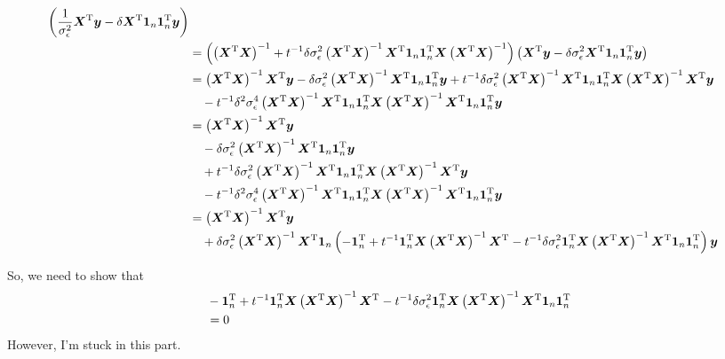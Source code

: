\documentclass[a4paper]{article}
\begin{document}
\begin{align*}
\left(\frac{1}{\sigma_{\epsilon}^{2}}\bm{X}^{\rm T}\bm{y} -\delta\bm{X}^{\rm T}\bm{1}_{n}\bm{1}_{n}^{\rm T}\bm{y}\right)\\
&= \left(\left(\bm{X}^{\rm T}\bm{X}\right)^{-1} + t^{-1}\delta\sigma_{\epsilon}^{2}\left(\bm{X}^{\rm T}\bm{X}\right)^{-1}\bm{X}^{\rm T}\bm{1}_{n}\bm{1}_{n}^{\rm T}\bm{X}\left(\bm{X}^{\rm T}\bm{X}\right)^{-1}\right)
\left(\bm{X}^{\rm T}\bm{y} -\delta\sigma_{\epsilon}^{2}\bm{X}^{\rm T}\bm{1}_{n}\bm{1}_{n}^{\rm T}\bm{y}\right)\\
&= \left(\bm{X}^{\rm T}\bm{X}\right)^{-1}\bm{X}^{\rm T}\bm{y} -\delta\sigma_{\epsilon}^{2}\left(\bm{X}^{\rm T}\bm{X}\right)^{-1}\bm{X}^{\rm T}\bm{1}_{n}\bm{1}_{n}^{\rm T}\bm{y} +  t^{-1}\delta\sigma_{\epsilon}^{2}\left(\bm{X}^{\rm T}\bm{X}\right)^{-1}\bm{X}^{\rm T}\bm{1}_{n}\bm{1}_{n}^{\rm T}\bm{X}\left(\bm{X}^{\rm T}\bm{X}\right)^{-1}\bm{X}^{\rm T}\bm{y}\\
&\quad -t^{-1}\delta^{2}\sigma_{\epsilon}^{4}\left(\bm{X}^{\rm T}\bm{X}\right)^{-1}\bm{X}^{\rm T}\bm{1}_{n}\bm{1}_{n}^{\rm T}\bm{X}\left(\bm{X}^{\rm T}\bm{X}\right)^{-1}\bm{X}^{\rm T}\bm{1}_{n}\bm{1}_{n}^{\rm T}\bm{y}\\
&= \left(\bm{X}^{\rm T}\bm{X}\right)^{-1}\bm{X}^{\rm T}\bm{y}\\
&\quad -\delta\sigma_{\epsilon}^{2}\left(\bm{X}^{\rm T}\bm{X}\right)^{-1}\bm{X}^{\rm T}\bm{1}_{n}\bm{1}_{n}^{\rm T}\bm{y}\\
&\quad +t^{-1}\delta\sigma_{\epsilon}^{2}\left(\bm{X}^{\rm T}\bm{X}\right)^{-1}\bm{X}^{\rm T}\bm{1}_{n}\bm{1}_{n}^{\rm T}\bm{X}\left(\bm{X}^{\rm T}\bm{X}\right)^{-1}\bm{X}^{\rm T}\bm{y}\\
&\quad -t^{-1}\delta^{2}\sigma_{\epsilon}^{4}\left(\bm{X}^{\rm T}\bm{X}\right)^{-1}\bm{X}^{\rm T}\bm{1}_{n}\bm{1}_{n}^{\rm T}\bm{X}\left(\bm{X}^{\rm T}\bm{X}\right)^{-1}\bm{X}^{\rm T}\bm{1}_{n}\bm{1}_{n}^{\rm T}\bm{y}\\
%
&= \left(\bm{X}^{\rm T}\bm{X}\right)^{-1}\bm{X}^{\rm T}\bm{y}\\
&\quad +\delta\sigma_{\epsilon}^{2}\left(\bm{X}^{\rm T}\bm{X}\right)^{-1}\bm{X}^{\rm T}\bm{1}_{n}\left(
-\bm{1}_{n}^{\rm T}
+t^{-1}\bm{1}_{n}^{\rm T}\bm{X}\left(\bm{X}^{\rm T}\bm{X}\right)^{-1}\bm{X}^{\rm T}
-t^{-1}\delta\sigma_{\epsilon}^{2}\bm{1}_{n}^{\rm T}\bm{X}\left(\bm{X}^{\rm T}\bm{X}\right)^{-1}\bm{X}^{\rm T}\bm{1}_{n}\bm{1}_{n}^{\rm T}
\right)\bm{y}
\end{align*}

{\color{red}
So, we need to show that 
\begin{align*}
&-\bm{1}_{n}^{\rm T} +t^{-1}\bm{1}_{n}^{\rm T}\bm{X}\left(\bm{X}^{\rm T}\bm{X}\right)^{-1}\bm{X}^{\rm T}
-t^{-1}\delta\sigma_{\epsilon}^{2}\bm{1}_{n}^{\rm T}\bm{X}\left(\bm{X}^{\rm T}\bm{X}\right)^{-1}\bm{X}^{\rm T}\bm{1}_{n}\bm{1}_{n}^{\rm T}\\
&= 0
\end{align*}
However, I'm stuck in this part.
}




%
%
\end{document}
